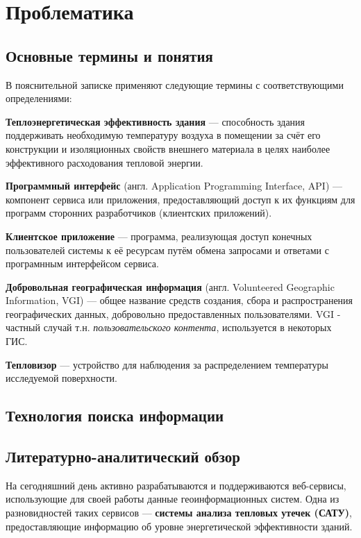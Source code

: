 \chapter{Проблематика}

\section{Основные термины и понятия}

В пояснительной записке применяют следующие термины с соответствующими определениями:

\textbf{Теплоэнергетическая эффективность здания} --- способность здания поддерживать необходимую температуру воздуха в помещении за счёт его конструкции и изоляционных свойств внешнего материала в целях наиболее эффективного расходования тепловой энергии.

\textbf{Программный интерфейс} (англ. Application Programming Interface, API) --- компонент сервиса или приложения, предоставляющий доступ к их функциям для программ сторонних разработчиков (клиентских приложений).

\textbf{Клиентское приложение} --- программа, реализующая доступ конечных пользователей системы к её ресурсам путём обмена запросами и ответами с програмнным интерфейсом сервиса. 

\textbf{Добровольная географическая информация} (англ. Volunteered Geographic Information, VGI) --- общее название средств создания, сбора и распространения географических данных, добровольно предоставленных пользователями. VGI - частный случай т.н. \textit{пользовательского контента}, используется в некоторых ГИС.

\textbf{Тепловизор} --- устройство для наблюдения за распределением температуры исследуемой поверхности.

\section{Технология поиска информации}

\section{Литературно-аналитический обзор}

\par
	На сегодняшний день активно разрабатываются и поддерживаются веб-сервисы, использующие для своей работы данные геоинформационных систем. Одна из разновидностей таких сервисов --- \textbf{системы анализа тепловых утечек (САТУ)}, предоставляющие информацию об уровне энергетической эффективности зданий.

